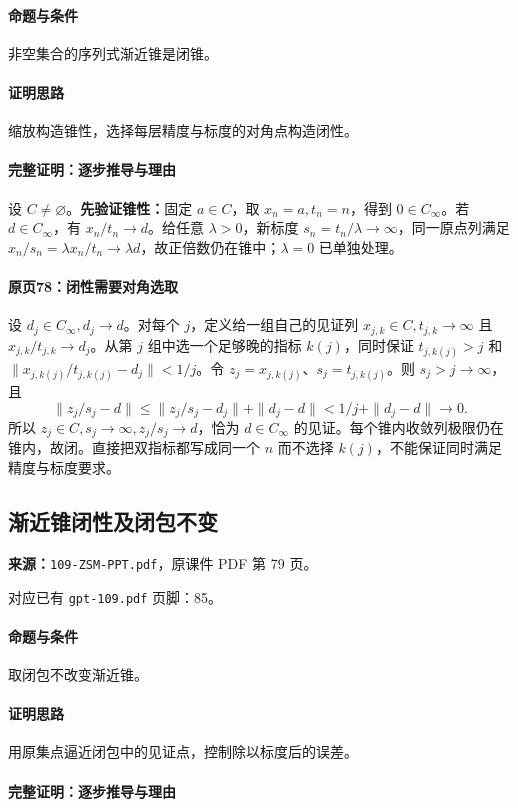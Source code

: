 \paragraph{命题与条件}非空集合的序列式渐近锥是闭锥。
\paragraph{证明思路}缩放构造锥性，选择每层精度与标度的对角点构造闭性。
\paragraph{完整证明：逐步推导与理由}

设 $C\ne\varnothing$。\textbf{先验证锥性：}固定 $a\in C$，取 $x_n=a,t_n=n$，得到 $0\in C_\infty$。若 $d\in C_\infty$，有 $x_n/t_n\to d$。给任意 $\lambda>0$，新标度 $s_n=t_n/\lambda\to\infty$，同一原点列满足 $x_n/s_n=\lambda x_n/t_n\to\lambda d$，故正倍数仍在锥中；$\lambda=0$ 已单独处理。
\paragraph{原页78：闭性需要对角选取}
设 $d_j\in C_\infty,d_j\to d$。对每个 $j$，定义给一组自己的见证列 $x_{j,k}\in C,t_{j,k}\to\infty$ 且 $x_{j,k}/t_{j,k}\to d_j$。从第 $j$ 组中选一个足够晚的指标 $k(j)$，同时保证 $t_{j,k(j)}>j$ 和 $\|x_{j,k(j)}/t_{j,k(j)}-d_j\|<1/j$。令 $z_j=x_{j,k(j)}$、$s_j=t_{j,k(j)}$。则 $s_j>j\to\infty$，且
\[\|z_j/s_j-d\|\le\|z_j/s_j-d_j\|+\|d_j-d\|<1/j+\|d_j-d\|\to0.\]
所以 $z_j\in C,s_j\to\infty,z_j/s_j\to d$，恰为 $d\in C_\infty$ 的见证。每个锥内收敛列极限仍在锥内，故闭。直接把双指标都写成同一个 $n$ 而不选择 $k(j)$，不能保证同时满足精度与标度要求。

\clearpage\subsection{渐近锥闭性及闭包不变}
\textbf{来源：}\texttt{109-ZSM-PPT.pdf}，原课件 PDF 第 79 页。\par
对应已有 \texttt{gpt-109.pdf} 页脚：85。\par
\paragraph{命题与条件}取闭包不改变渐近锥。
\paragraph{证明思路}用原集点逼近闭包中的见证点，控制除以标度后的误差。
\paragraph{完整证明：逐步推导与理由}

